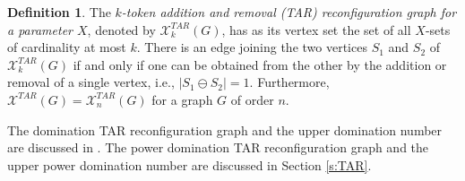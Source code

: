 \documentclass{article}
\numberwithin{figure}{section}   %
\theoremstyle{definition}
\theoremstyle{definition}
\newtheorem{defn}[thm]{Definition}
\theoremstyle{definition}
\newcommand{\ol}{\overline}
\newcommand{\Z}{\operatorname{Z}}
\newcommand{\pd}{\gamma_P}
\newcommand{\zbar}{\ol\Z}
\newcommand{\gbar}{\ol\gamma}
\newcommand{\pdbar}{\ol\pd}
\newcommand{\te}{\mathscr{PD}^{TJ}}
\newcommand{\xtar}{\mathscr{X}^{TAR}}
\newcommand{\df}[1]{{\textcolor{red}{[}\textcolor{red}{{DF: \em #1}]}}}
\begin{document}
 



\begin{defn} The {\em $k$-token addition and removal (TAR) reconfiguration graph for a parameter $X$}, denoted by $\xtar_k(G)$, has as its vertex set the set of all  $X$-sets of cardinality at most $k$. There is an edge joining the two vertices  $S_1$ and $S_2$ of $\xtar_k(G)$ if and only if one can be obtained from the other by the addition or removal of a single vertex, i.e., $|S_1 \ominus S_2|=1$.  Furthermore, $\xtar (G)=\xtar_n(G)$ for a graph $G$ of order $n$.
\end{defn}



 
The domination TAR reconfiguration graph and the upper domination number are discussed in \cite{HS14}. The power domination TAR reconfiguration graph and the upper power domination number are discussed in Section \ref{s:TAR}. %
\end{document}
